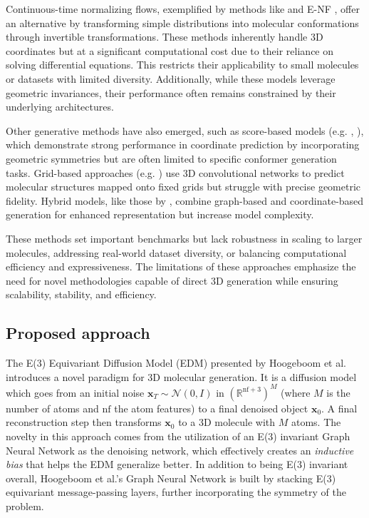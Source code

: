 \documentclass[sigconf]{acmart}
\begin{document}
Continuous-time normalizing flows, exemplified by methods like \cite{kohler2020equivariant} and E-NF \cite{garcia2021n}, offer an alternative by transforming simple distributions into molecular conformations through invertible transformations. These methods inherently handle 3D coordinates but at a significant computational cost due to their reliance on solving differential equations. This restricts their applicability to small molecules or datasets with limited diversity. Additionally, while these models leverage geometric invariances, their performance often remains constrained by their underlying architectures.

Other generative methods have also emerged, such as score-based models (e.g. \cite{shi2021learning}, \cite{xu}), which demonstrate strong performance in coordinate prediction by incorporating geometric symmetries but are often limited to specific conformer generation tasks. Grid-based approaches (e.g. \cite{ragoza2020learning}) use 3D convolutional networks to predict molecular structures mapped onto fixed grids but struggle with precise geometric fidelity. Hybrid models, like those by \cite{ganea2021geomol}, combine graph-based and coordinate-based generation for enhanced representation but increase model complexity.

These methods set important benchmarks but lack robustness in scaling to larger molecules, addressing real-world dataset diversity, or balancing computational efficiency and expressiveness. The limitations of these approaches emphasize the need for novel methodologies capable of direct 3D generation while ensuring scalability, stability, and efficiency.

\subsection{Proposed approach}
The E(3) Equivariant Diffusion Model (EDM) presented by Hoogeboom et al. \cite{edm} introduces a novel paradigm for 3D molecular generation. It is a diffusion model which goes from an initial noise $\mathbf{x}_T\sim\mathcal{N}(0,I)$ in $(\mathbb{R}^{\text{nf}+3})^M$ (where $M$ is the number of atoms and $\text{nf}$ the atom features) to a final denoised object $\mathbf{x}_0$. A final reconstruction step then transforms $\mathbf{x}_0$ to a 3D molecule with $M$ atoms. The novelty in this approach comes from the utilization of an E(3) invariant Graph Neural Network as the denoising network, which effectively creates an \textit{inductive bias} that helps the EDM generalize better. In addition to being E(3) invariant overall, Hoogeboom et al.'s Graph Neural Network is built by stacking E(3) equivariant message-passing layers, further incorporating the symmetry of the problem.
\end{document}
